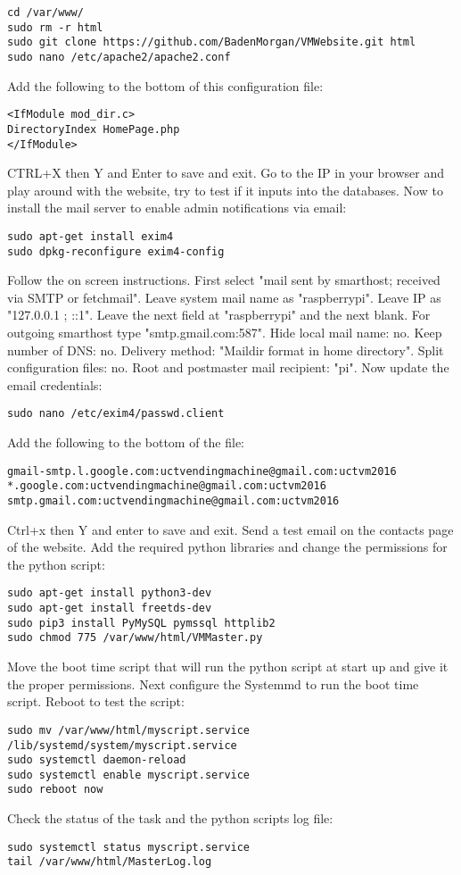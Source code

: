 \documentclass[a4paper,11pt]{article}
\numberwithin{figure}{section}
\numberwithin{table}{section}
\begin{document}
\begin{appendices}
\begin{lstlisting}[firstnumber=16]
cd /var/www/
sudo rm -r html
sudo git clone https://github.com/BadenMorgan/VMWebsite.git html
sudo nano /etc/apache2/apache2.conf
\end{lstlisting}
Add the following to the bottom of this configuration file:
\begin{lstlisting}[firstnumber=20]
<IfModule mod_dir.c>
DirectoryIndex HomePage.php
</IfModule>
\end{lstlisting}
CTRL+X then Y and Enter to save and exit. Go to the IP in your browser and play around with the website, try to test if it inputs into the databases. Now to install the mail server to enable admin notifications via email:
\begin{lstlisting}[firstnumber=23]
sudo apt-get install exim4
sudo dpkg-reconfigure exim4-config
\end{lstlisting}
Follow the on screen instructions. First select "mail sent by smarthost; received via SMTP or fetchmail". Leave system mail name as "raspberrypi". Leave IP as "127.0.0.1 ; ::1". Leave the next field at "raspberrypi" and the next blank. For outgoing smarthost type "smtp.gmail.com:587". Hide local mail name: no. Keep number of DNS: no. Delivery method: "Maildir format in home directory". Split configuration files: no. Root and postmaster mail recipient: "pi". Now update the email credentials:
\begin{lstlisting}[firstnumber=25]
sudo nano /etc/exim4/passwd.client
\end{lstlisting}
Add the following to the bottom of the file:
\begin{lstlisting}[firstnumber=26]
gmail-smtp.l.google.com:uctvendingmachine@gmail.com:uctvm2016
*.google.com:uctvendingmachine@gmail.com:uctvm2016
smtp.gmail.com:uctvendingmachine@gmail.com:uctvm2016
\end{lstlisting}
Ctrl+x then Y and enter to save and exit. Send a test email on the contacts page of the website. Add the required python libraries and change the permissions for the python script:
\begin{lstlisting}[firstnumber=29]
sudo apt-get install python3-dev
sudo apt-get install freetds-dev
sudo pip3 install PyMySQL pymssql httplib2
sudo chmod 775 /var/www/html/VMMaster.py
\end{lstlisting}
Move the boot time script that will run the python script at start up and give it the proper permissions. Next configure the Systemmd to run the boot time script. Reboot to test the script:
\begin{lstlisting}[firstnumber=33]
sudo mv /var/www/html/myscript.service /lib/systemd/system/myscript.service
sudo systemctl daemon-reload
sudo systemctl enable myscript.service
sudo reboot now
\end{lstlisting}
Check the status of the task and the python scripts log file:
\begin{lstlisting}[firstnumber=37]
sudo systemctl status myscript.service
tail /var/www/html/MasterLog.log
\end{lstlisting}


\end{appendices}
\end{document}
